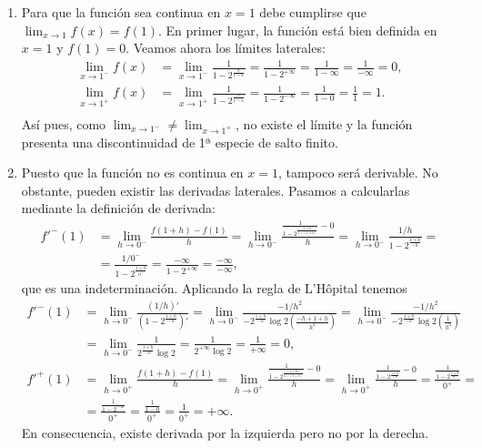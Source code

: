{
\begin{enumerate}
\item Para que la función sea continua en $x=1$ debe cumplirse que $\lim_{x\rightarrow 1}f(x)=f(1)$. En primer lugar, la función está bien definida en $x=1$ y $f(1)=0$. Veamos ahora los límites laterales:
\begin{align*}
\lim_{x\rightarrow 1^-} f(x) &= \lim_{x\rightarrow 1^-} \frac{1}{1-2^{\frac{x}{1-x}}} = \frac{1}{1-2^{+\infty}}= \frac{1}{1-\infty}=\frac{1}{-\infty}=0,\\
\lim_{x\rightarrow 1^+} f(x) &= \lim_{x\rightarrow 1^+} \frac{1}{1-2^{\frac{x}{1-x}}} = \frac{1}{1-2^{-\infty}}= \frac{1}{1-0}=\frac{1}{1}=1.\\
\end{align*}
Así pues, como $\lim_{x\rightarrow 1^-}\neq \lim_{x\rightarrow 1^+}$, no existe el límite y la función presenta una discontinuidad de 1ª especie de salto finito.

\item Puesto que la función no es continua en $x=1$, tampoco será derivable. No obstante, pueden existir las derivadas laterales. Pasamos a calcularlas mediante la definición de derivada:
\begin{align*}
f'^-(1)&= \lim_{h\rightarrow 0^-}\frac{f(1+h)-f(1)}{h}= \lim_{h\rightarrow 0^-}\frac{\frac{1}{1-2^{\frac{1+h}{1-(1+h)}}}-0}{h} =  \lim_{h\rightarrow 0^-}\frac{1/h}{1-2^{\frac{1+h}{-h}}}=\\
&= \frac{1/0^-}{1-2^{\frac{1+0}{0^+}}} =\frac{-\infty}{1-2^{+\infty}} =\frac{-\infty}{-\infty},
\end{align*}
que es una indeterminación. Aplicando la regla de L'Hôpital tenemos
\begin{align*}
f'^-(1)&= \lim_{h\rightarrow 0^-}\frac{(1/h)'}{\left(1-2^{\frac{1+h}{-h}}\right)'} = \lim_{h\rightarrow 0^-}\frac{-1/h^2}{-2^{\frac{1+h}{-h}}\log 2 \left(\frac{-h+1+h}{h^2}\right)} = \lim_{h\rightarrow 0^-}\frac{-1/h^2}{-2^{\frac{1+h}{-h}}\log 2 \left(\frac{1}{h^2}\right)} \\
&= \lim_{h\rightarrow 0^-}\frac{1}{2^{\frac{1+h}{-h}}\log 2 } =\frac{1}{2^{+\infty}\log 2}=\frac{1}{+\infty}=0,\\
f'^+(1)&= \lim_{h\rightarrow 0^+}\frac{f(1+h)-f(1)}{h}=
\lim_{h\rightarrow 0^+}\frac{\frac{1}{1-2^{\frac{1+h}{1-(1+h)}}}-0}{h} =
\lim_{h\rightarrow 0^+}\frac{\frac{1}{1-2^{\frac{1+h}{-h}}}-0}{h} =
\frac{\frac{1}{1-2^{\frac{1+0}{0^-}}}}{0^+} = \\
&= \frac{\frac{1}{1-2^{-\infty}}}{0^+} =
\frac{\frac{1}{1-0}}{0^+}=\frac{1}{0^+}=+\infty.
\end{align*}
En consecuencia, existe derivada por la izquierda pero no por la derecha.
\end{enumerate}
}



